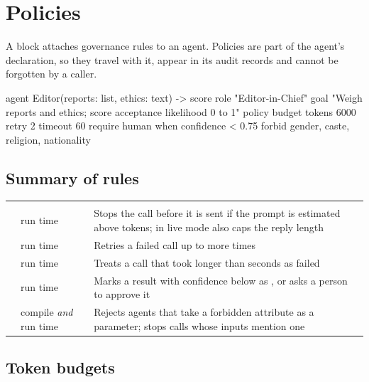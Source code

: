 \chapter{Policies}
\label{ch:policies}

A  block attaches governance rules to an agent. Policies are part of the agent's declaration, so they travel with it, appear in its audit records and cannot be forgotten by a caller.

\begin{algo}
agent Editor(reports: list, ethics: text) -> score {
    role  "Editor-in-Chief"
    goal  "Weigh {reports} and {ethics}; score acceptance likelihood 0 to 1"
    policy {
        budget tokens 6000
        retry 2
        timeout 60
        require human when confidence < 0.75
        forbid gender, caste, religion, nationality
    }
}
\end{algo}

\section{Summary of rules}

\begin{center}
\small
\begin{tabularx}{\linewidth}{@{}L{4.6cm}L{2.2cm}Y@{}}
\toprule
{} &  & \\
\goldrule
{}  & run time & Stops the call before it is sent if the prompt is estimated above  tokens; in live mode also caps the reply length\\
  & run time & Retries a failed call up to  more times\\
  & run time & Treats a call that took longer than  seconds as failed\\
  & run time & Marks a result with confidence below  as , or asks a person to approve it\\
  & compile \emph{and} run time & Rejects agents that take a forbidden attribute as a parameter; stops calls whose inputs mention one\\
\bottomrule
\end{tabularx}
\end{center}

\section{Token budgets}

